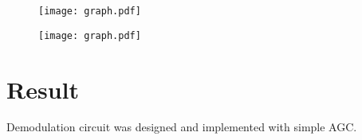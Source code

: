 \begin{figure}
	\texttt{[image: graph.pdf]}
\end{figure}

\begin{figure}
	\texttt{[image: graph.pdf]}
\end{figure}


\section*{Result}

Demodulation circuit was designed and implemented with simple AGC.

